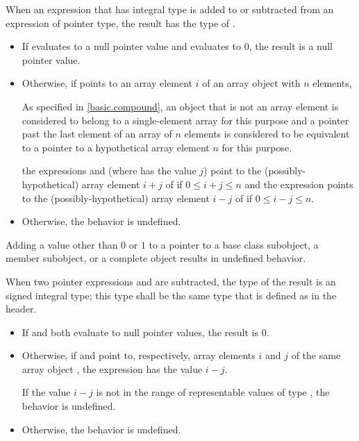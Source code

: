 \pnum
{}%
When an expression  that has integral type
is added to or subtracted from an expression  of pointer type,
the result has the type of .
\begin{itemize}
\item If  evaluates to a null pointer value and
 evaluates to 0, the result is a null pointer value.
\item Otherwise, if  points to an array element $i$
of an array object  with $n$ elements,
\begin{footnote}
As specified in \ref{basic.compound},
an object that is not an array element
is considered to belong to a single-element array for this purpose and
a pointer past the last element of an array of $n$ elements
is considered to be equivalent to a pointer to a hypothetical array element
$n$ for this purpose.
\end{footnote}
the expressions  and 
(where  has the value $j$)
point to the (possibly-hypothetical) array element
$i + j$ of  if $0 \le i + j \le n$
and the expression 
points to the (possibly-hypothetical) array element
$i - j$ of  if $0 \le i - j \le n$.
\item Otherwise, the behavior is undefined.
\end{itemize}
\begin{note}
Adding a value other than $0$ or $1$
to a pointer to a base class subobject, a member subobject,
or a complete object results in undefined behavior.
\end{note}

\pnum
{}%
%
%
%
When two pointer expressions  and  are subtracted,
the type of the result is an  signed
integral type; this type shall be the same type that is defined as
 in the 
header.
\begin{itemize}
\item If  and  both evaluate to null pointer values,
the result is 0.
\item Otherwise, if  and  point to, respectively,
array elements $i$ and $j$
of the same array object ,
the expression  has the value $i - j$.
\begin{note}
If the value $i - j$
is not in the range of representable values
of type ,
the behavior is undefined.
\end{note}
\item Otherwise, the behavior is undefined.
\end{itemize}

